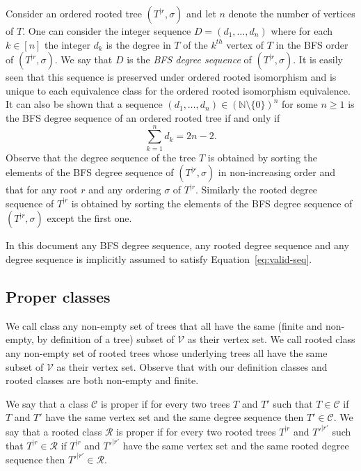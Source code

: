 \documentclass[11 pt]{modarticle}
\newcommand{\cN}{\mathbb{N}}
\newcommand{\vset}{\mathcal{V}}
\newcommand{\rtree}[2]{{#1}^{\lvert #2}}
\newcommand{\ortree}[3]{(\rtree{#1}{#2},{#3})}
\newcommand{\tclass}{\mathcal{C}}
\newcommand{\rtclass}{\mathcal{R}}
\begin{document}
Consider an ordered rooted tree $\ortree{T}{r}{\sigma}$ and let $n$ denote the number of vertices of $T$. One can consider the integer sequence $D = (d_1, \dots, d_n)$ where for each $k \in [n]$ the integer $d_k$ is the degree in $T$ of the $k^{th}$ vertex of $T$ in the BFS order of $\ortree{T}{r}{\sigma}$. We say that $D$ is the \textit{BFS degree sequence} of $\ortree{T}{r}{\sigma}$. It is easily seen that this sequence is preserved under ordered rooted isomorphism and is unique to each equivalence class for the ordered rooted isomorphism equivalence. It can also be shown that a sequence $(d_1, \dots, d_n) \in (\cN \setminus \{0\})^n$ for some $n \geq 1$ is the BFS degree sequence of an ordered rooted tree if and only if
\begin{equation}
	\underset{k=1}{\overset{n}{\sum}} d_k = 2n - 2 \label{eq:valid-seq}.
\end{equation}
Observe that the degree sequence of the tree $T$ is obtained by sorting the elements of the BFS degree sequence of $\ortree{T}{r}{\sigma}$ in non-increasing order and that for any root $r$ and any ordering $\sigma$ of $\rtree{T}{r}$. Similarly the rooted degree sequence of $\rtree{T}{r}$ is obtained by sorting the elements of the BFS degree sequence of $\ortree{T}{r}{\sigma}$ except the first one.

In this document any BFS degree sequence, any rooted degree sequence and any degree sequence is implicitly assumed to satisfy Equation~\eqref{eq:valid-seq}.

\subsection{Proper classes}

We call class any non-empty set of trees that all have the same (finite and non-empty, by definition of a tree) subset of $\vset$ as their vertex set. We call rooted class any non-empty set of rooted trees whose underlying trees all have the same subset of $\vset$ as their vertex set. Observe that with our definition classes and rooted classes are both non-empty and finite.

\begin{defi}
We say that a class $\tclass$ is proper if for every two trees $T$ and $T'$ such that $T \in \tclass$ if $T$ and $T'$ have the same vertex set and the same degree sequence then $T' \in \tclass$. We say that a rooted class $\rtclass$ is proper if for every two rooted trees $\rtree{T}{r}$ and $\rtree{T'}{r'}$ such that $\rtree{T}{r} \in \rtclass$ if $\rtree{T}{r}$ and $\rtree{T'}{r'}$ have the same vertex set and the same rooted degree sequence then $\rtree{T'}{r'} \in \rtclass$.
\end{defi}
\end{document}

